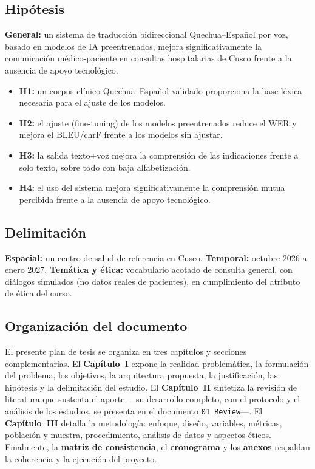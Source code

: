 \documentclass[12pt,a4paper]{article}
\begin{document}
\subsection{Hip{\'o}tesis}
\textbf{General:} un sistema de traducci{\'o}n bidireccional Quechua--Espa{\~n}ol por voz,
basado en modelos de IA preentrenados, mejora significativamente la comunicaci{\'o}n
m{\'e}dico-paciente en consultas hospitalarias de Cusco frente a la ausencia de apoyo tecnol{\'o}gico.
\begin{itemize}
  \item \textbf{H1:} un corpus cl{\'i}nico Quechua--Espa{\~n}ol validado proporciona la base l{\'e}xica necesaria para el ajuste de los modelos.
  \item \textbf{H2:} el ajuste (fine-tuning) de los modelos preentrenados reduce el WER y mejora el BLEU/chrF frente a los modelos sin ajustar.
  \item \textbf{H3:} la salida texto+voz mejora la comprensi{\'o}n de las indicaciones frente a solo texto, sobre todo con baja alfabetizaci{\'o}n.
  \item \textbf{H4:} el uso del sistema mejora significativamente la comprensi{\'o}n mutua percibida frente a la ausencia de apoyo tecnol{\'o}gico.
\end{itemize}

\subsection{Delimitaci{\'o}n}
\textbf{Espacial:} un centro de salud de referencia en Cusco. \textbf{Temporal:} octubre 2026
a enero 2027. \textbf{Tem{\'a}tica y {\'e}tica:} vocabulario acotado de consulta general, con
di{\'a}logos simulados (no datos reales de pacientes), en cumplimiento del atributo de {\'e}tica
del curso.

\subsection{Organizaci{\'o}n del documento}
El presente plan de tesis se organiza en tres cap{\'i}tulos y secciones complementarias. El
\textbf{Cap{\'i}tulo~I} expone la realidad problem{\'a}tica, la formulaci{\'o}n del problema, los
objetivos, la arquitectura propuesta, la justificaci{\'o}n, las hip{\'o}tesis y la delimitaci{\'o}n
del estudio. El \textbf{Cap{\'i}tulo~II} sintetiza la revisi{\'o}n de literatura que sustenta el
aporte ---su desarrollo completo, con el protocolo y el an{\'a}lisis de los estudios, se presenta
en el documento \texttt{01\_Review}---. El \textbf{Cap{\'i}tulo~III} detalla la metodolog{\'i}a:
enfoque, dise{\~n}o, variables, m{\'e}tricas, poblaci{\'o}n y muestra, procedimiento, an{\'a}lisis
de datos y aspectos {\'e}ticos. Finalmente, la \textbf{matriz de consistencia}, el
\textbf{cronograma} y los \textbf{anexos} respaldan la coherencia y la ejecuci{\'o}n del proyecto.
\end{document}
